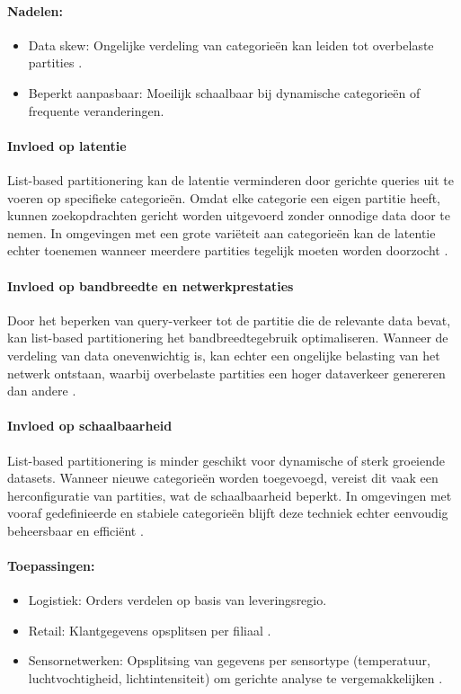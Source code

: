 \paragraph{Nadelen:}
\begin{itemize}
    \item Data skew: Ongelijke verdeling van categorieën kan leiden tot overbelaste partities \autocite{Mahmud2020}.
    \item Beperkt aanpasbaar: Moeilijk schaalbaar bij dynamische categorieën of frequente veranderingen.
\end{itemize}
 
\paragraph{Invloed op latentie} 
List-based partitionering kan de latentie verminderen door gerichte queries uit te voeren op specifieke categorieën. Omdat elke categorie een eigen partitie heeft, kunnen zoekopdrachten gericht worden uitgevoerd zonder onnodige data door te nemen. In omgevingen met een grote variëteit aan categorieën kan de latentie echter toenemen wanneer meerdere partities tegelijk moeten worden doorzocht \autocite{Ponnusamy2024, Mahmud2020}.
 
\paragraph{Invloed op bandbreedte en netwerkprestaties} 
Door het beperken van query-verkeer tot de partitie die de relevante data bevat, kan list-based partitionering het bandbreedtegebruik optimaliseren. Wanneer de verdeling van data onevenwichtig is, kan echter een ongelijke belasting van het netwerk ontstaan, waarbij overbelaste partities een hoger dataverkeer genereren dan andere \autocite{Ponnusamy2024}.
 
\paragraph{Invloed op schaalbaarheid} 
List-based partitionering is minder geschikt voor dynamische of sterk groeiende datasets. Wanneer nieuwe categorieën worden toegevoegd, vereist dit vaak een herconfiguratie van partities, wat de schaalbaarheid beperkt. In omgevingen met vooraf gedefinieerde en stabiele categorieën blijft deze techniek echter eenvoudig beheersbaar en efficiënt \autocite{Mahmud2020}.
 
\paragraph{Toepassingen:}
\begin{itemize}
    \item Logistiek: Orders verdelen op basis van leveringsregio.
    \item Retail: Klantgegevens opsplitsen per filiaal \autocite{Ponnusamy2024}.
    \item Sensornetwerken: Opsplitsing van gegevens per sensortype (temperatuur, luchtvochtigheid, lichtintensiteit) om gerichte analyse te vergemakkelijken \autocite{Mahmud2020}.
\end{itemize}

